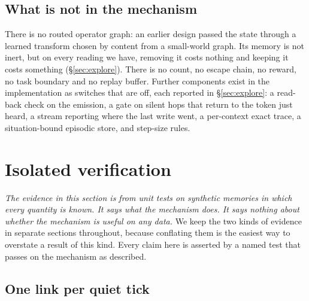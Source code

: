 \documentclass[11pt,a4paper]{article}
\theoremstyle{plain}
\theoremstyle{definition}
\theoremstyle{remark}
\begin{document}
\subsection{What is not in the mechanism}

There is no routed operator graph: an earlier design passed the state through a
learned transform chosen by content from a small-world graph. Its memory is not
inert, but on every reading we have, removing it costs nothing and keeping it
costs something (\S\ref{sec:explore}). There is no count, no escape chain, no
reward, no task boundary and no replay buffer. Further components exist in the
implementation as switches that are off, each reported in \S\ref{sec:explore}:
a read-back check on the emission, a gate on silent hops that return to the
token just heard, a stream reporting where the last write went, a per-context
exact trace, a situation-bound episodic store, and step-size rules.

\section{Isolated verification}
\label{sec:isolated}

\emph{The evidence in this section is from unit tests on synthetic memories in
which every quantity is known. It says what the mechanism does. It says nothing
about whether the mechanism is useful on any data.} We keep the two kinds of
evidence in separate sections throughout, because conflating them is the easiest
way to overstate a result of this kind. Every claim here is asserted by a named
test that passes on the mechanism as described.

\subsection{One link per quiet tick}
\end{document}
